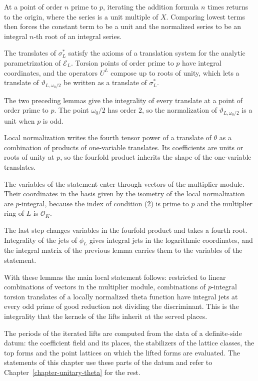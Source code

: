 At a point of order $n$ prime to $p$, iterating the addition formula $n$ times returns to the
origin, where the series is a unit multiple of $X$. Comparing lowest terms then forces the constant
term to be a unit and the normalized series to be an integral $n$-th root of an integral series.

The translates of $\sigma^*_L$ satisfy the axioms of a translation system for the analytic
parametrization of $\mathcal E_L$. Torsion points of order prime to $p$ have integral coordinates,
and the operators $U^L$ compose up to roots of unity, which lets a translate of
$\vartheta_{L,\omega_0/2}$ be written as a translate of $\sigma^*_L$.

The two preceding lemmas give the integrality of every translate at a point of order prime to $p$.
The point $\omega_0/2$ has order $2$, so the normalization of $\vartheta_{L,\omega_0/2}$ is a unit
when $p$ is odd.

Local normalization writes the fourth tensor power of a translate of $\theta$ as a combination of
products of one-variable translates. Its coefficients are units or roots of unity at $p$, so the
fourfold product inherits the shape of the one-variable translates.

The variables of the statement enter through vectors of the multiplier module. Their coordinates in
the basis given by the isometry of the local normalization are $p$-integral, because the index of
condition (2) is prime to $p$ and the multiplier ring of $L$ is $\mathcal O_K$.

The last step changes variables in the fourfold product and takes a fourth root. Integrality of
the jets of $\phi_L$ gives integral jets in the logarithmic coordinates, and the integral matrix
of the previous lemma carries them to the variables of the statement.

With these lemmas the main local statement follows: restricted to linear combinations of
vectors in the multiplier module, combinations of $p$-integral torsion translates of a locally
normalized theta function have integral jets at every odd prime of good reduction not dividing the
discriminant. This is the integrality that the kernels of the lifts inherit at the served places.

The periods of the iterated lifts are computed from the data of a definite-side datum: the
coefficient field and its places, the stabilizers of the lattice classes, the top forms and the
point lattices on which the lifted forms are evaluated. The statements of this chapter use these
parts of the datum and refer to Chapter~\ref{chapter-unitary-theta} for the rest.

